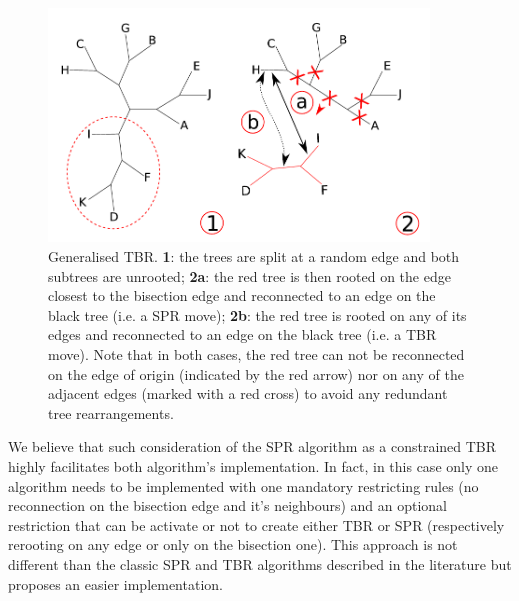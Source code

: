 \documentclass[12pt,letterpaper]{article}
\begin{document}
\begin{figure}[!htbp]
\centering
   \includegraphics[width=0.9\textwidth]{Figure/TBR_modif.pdf}
\caption{Generalised TBR. \textbf{1}: the trees are split at a random edge and both subtrees are unrooted; \textbf{2a}: the red tree is then rooted on the edge closest to the bisection edge and reconnected to an edge on the black tree (i.e. a SPR move); \textbf{2b}: the red tree is rooted on any of its edges and reconnected to an edge on the black tree (i.e. a TBR move). Note that in both cases, the red tree can not be reconnected on the edge of origin (indicated by the red arrow) nor on any of the adjacent edges (marked with a red cross) to avoid any redundant tree rearrangements.}
\label{Figure_TBR_modif}
\end{figure}

We believe that such consideration of the SPR algorithm as a constrained TBR highly facilitates both algorithm's implementation.
In fact, in this case only one algorithm needs to be implemented with one mandatory restricting rules (no reconnection on the bisection edge and it's neighbours) and an optional restriction that can be activate or not to create either TBR or SPR (respectively rerooting on any edge or only on the bisection one).
This approach is not different than the classic SPR and TBR algorithms described in the literature \citep{allen2001subtree,felsenstein2004inferring} but proposes an easier implementation.
\end{document}
